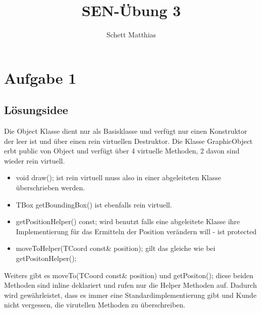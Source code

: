 \documentclass[a4paper,oneside,openany]{tufte-book}
\author{Schett Matthias}
\title{SEN-\"{U}bung 3}
\begin{document}


\frontmatter

\maketitle
\tableofcontents
\mainmatter

\chapter{Aufgabe 1}

\section{L\"{o}sungsidee}

Die Object Klasse dient nur als Basisklasse und verfügt nur einen Konstruktor der leer ist und über einen rein virtuellen Destruktor.
Die Klasse GraphicObject erbt public von Object und verfügt über 4 virtuelle Methoden, 2 davon sind wieder rein virtuell.

\begin{itemize}
	\item void draw(); ist rein virtuell muss also in einer abgeleiteten Klasse überschrieben werden.
	\item TBox getBoundingBox() ist ebenfalls rein virtuell.
	\item getPositionHelper() const; wird benutzt falls eine abgeleitete Klasse ihre Implementierung für das Ermitteln der Position verändern will - ist protected
	\item moveToHelper(TCoord const\& position); gilt das gleiche wie bei getPositonHelper();
\end{itemize}

Weiters gibt es moveTo(TCoord const\& position) und getPositon(); diese beiden Methoden sind inline deklariert und rufen nur die Helper Methoden auf. Dadurch wird gewährleistet, dass es immer eine Standardimplementierung gibt
und Kunde nicht vergessen, die virutellen Methoden zu überschreiben.
\end{document}
